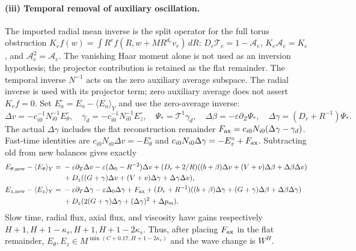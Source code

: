 \documentclass[10pt,a4paper]{article}
\begin{document}
\paragraph{(iii) Temporal removal of auxiliary oscillation.}
The imported radial mean inverse is the split operator for the full torus
obstruction $K_e f(w)=\int R^e f(R,w+M R^{d_r}v_r)\,dR$:
$D_e\mathcal T_e=1-\mathcal A_e$, $K_e\mathcal A_e=K_e$, and
$\mathcal A_e^2=\mathcal A_e$.  The vanishing Haar moment alone is not used as
an inversion hypothesis; the projector contribution is retained as the flat
remainder. The temporal inverse $N^{-1}$ acts on the zero auxiliary
average subspace. The radial inverse is used with its projector term;
zero auxiliary average does not assert $K_e f=0$.
Set $E_a^\circ=E_a-\langle E_a\rangle_Y$ and use the zero-average inverse:
\[
 \Delta v=-c_{i0}^{-1}N_{i0}^{-1}E_\theta^\circ,\quad
 \gamma_d=-c_{i0}^{-1}N_{i0}^{-1}E_z^\circ,\quad
 \Psi_*=\mathcal T^1\gamma_d,\quad
 \Delta\beta=-\varepsilon\partial_Z\Psi_*,\quad
 \Delta\gamma=(D_r+R^{-1})\Psi_* .
\]
The actual $\Delta\gamma$ includes the flat reconstruction remainder
$F_{\rm ax}=c_{i0}N_{i0}(\Delta\gamma-\gamma_d)$.  Fast-time identities are
$c_{i0}N_{i0}\Delta v=-E_\theta^\circ$ and
$c_{i0}N_{i0}\Delta\gamma=-E_z^\circ+F_{\rm ax}$.  Subtracting old from new
balances gives exactly
\begin{align}
 E_{\theta,\rm new}-\langle E_\theta\rangle_Y={}&-\varepsilon\partial_T\Delta v
 -\varepsilon(\Delta_0-R^{-2})\Delta v
 +(D_r+2/R)((b+\beta)\Delta v+(V+v)\Delta\beta+\Delta\beta\Delta v)\\
 &+D_z((G+\gamma)\Delta v+(V+v)\Delta\gamma+\Delta\gamma\Delta v),\\
 E_{z,\rm new}-\langle E_z\rangle_Y={}&-\varepsilon\partial_T\Delta\gamma-\varepsilon\Delta_0\Delta\gamma+F_{\rm ax}
 +(D_r+R^{-1})((b+\beta)\Delta\gamma+(G+\gamma)\Delta\beta+\Delta\beta\Delta\gamma)\\
 &+D_z(2(G+\gamma)\Delta\gamma+(\Delta\gamma)^2+\Delta p_m).
\end{align}
Slow time, radial flux, axial flux, and viscosity have gains respectively
$H+1,H+1-\kappa_s,H+1,H+1-2\kappa_s$.  Thus, after placing $F_{\rm ax}$ in
the flat remainder, $E_\theta,E_z\in M^{\min(C+0.17,H+1-2\kappa_s)}$ and
the wave change is $W^H$.
\end{document}
